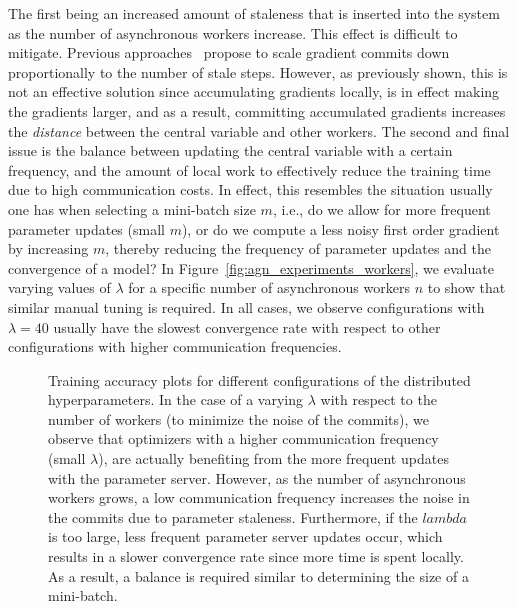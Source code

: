 \documentclass[wcp]{jmlr}
\begin{document}
The first being an increased amount of staleness that is inserted into the system as the number of asynchronous workers increase. This effect is difficult to mitigate. Previous approaches~\cite{jiang2017heterogeneity} propose to scale gradient commits down proportionally to the number of stale steps. However, as previously shown, this is not an effective solution since accumulating gradients locally, is in effect making the gradients larger, and as a result, committing accumulated gradients increases the \emph{distance} between the central variable and other workers. The second and final issue is the balance between updating the central variable with a certain frequency, and the amount of local work to effectively reduce the training time due to high communication costs. In effect, this resembles the situation usually one has when selecting a mini-batch size $m$, i.e., do we allow for more frequent parameter updates (small $m$), or do we compute a less noisy first order gradient by increasing $m$, thereby reducing the frequency of parameter updates and the convergence of a model? In Figure~\ref{fig:agn_experiments_workers}, we evaluate varying values of $\lambda$ for a specific number of asynchronous workers $n$ to show that similar manual tuning is required. In all cases, we observe configurations with $\lambda = 40$ usually have the slowest convergence rate with respect to other configurations with higher communication frequencies.\\

\begin{figure}
  \centering
  \caption{Training accuracy plots for different configurations of the distributed hyperparameters. In the case of a varying $\lambda$ with respect to the number of workers (to minimize the noise of the commits), we observe that optimizers with a higher communication frequency (small $\lambda$), are actually benefiting from the more frequent updates with the parameter server. However, as the number of asynchronous workers grows, a low communication frequency increases the noise in the commits due to parameter staleness. Furthermore, if the $lambda$ is too large, less frequent parameter server updates occur, which results in a slower convergence rate since more time is spent locally. As a result, a balance is required similar to determining the size of a mini-batch.}
  \label{fig:agn_temporal_efficiency}
\end{figure}
\end{document}
